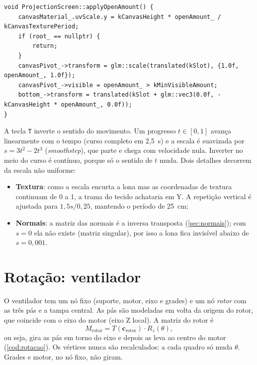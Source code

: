 \documentclass[
  12pt,          %
  oneside,       %
  a4paper,       %
  chapter=TITLE, %
  english,
  brazil,        %
]{abntex2}
\newcommand{\fonteautores}{\fonte{Elaborado pelos autores (2026).}}
\begin{document}
\begin{lstlisting}[caption={Escala da lona (\texttt{src/objects/projection\_screen.cpp}, sem comentários)},label={cod:escala}]
void ProjectionScreen::applyOpenAmount() {
    canvasMaterial_.uvScale.y = kCanvasHeight * openAmount_ / kCanvasTexturePeriod;
    if (root_ == nullptr) {
        return;
    }
    canvasPivot_->transform = glm::scale(translated(kSlot), {1.0f, openAmount_, 1.0f});
    canvasPivot_->visible = openAmount_ > kMinVisibleAmount;
    bottom_->transform = translated(kSlot + glm::vec3(0.0f, -kCanvasHeight * openAmount_, 0.0f));
}
\end{lstlisting}
\fonteautores

A tecla \texttt{T} inverte o sentido do movimento. Um progresso $t \in [0, 1]$ avança linearmente com o tempo
(curso completo em 2,5~s) e a escala é suavizada por $s = 3t^2 - 2t^3$ (\emph{smoothstep}), que parte e chega
com velocidade nula. Inverter no meio do curso é contínuo, porque só o sentido de $t$ muda. Dois detalhes
decorrem da escala não uniforme:
\begin{itemize}
  \item \textbf{Textura}: como a escala encurta a lona mas as coordenadas de textura continuam de 0 a 1, a trama
        do tecido achataria em Y. A repetição vertical é ajustada para $1{,}5 s / 0{,}25$, mantendo o período
        de 25~cm;
  \item \textbf{Normais}: a matriz das normais é a inversa transposta (\autoref{sec:normais}); com $s = 0$
        ela não existe (matriz singular), por isso a lona fica invisível abaixo de $s = 0{,}001$.
\end{itemize}

\section{Rotação: ventilador}

O ventilador tem um nó fixo (suporte, motor, eixo e grades) e um nó \emph{rotor} com as três pás e a tampa
central. As pás são modeladas em volta da origem do rotor, que coincide com o eixo do motor (eixo Z local).
A matriz do rotor é
\begin{equation}
  M_{\text{rotor}} = T(\mathbf{c}_{\text{rotor}}) \cdot R_z(\theta),
  \label{eq:rotacao}
\end{equation}
ou seja, gira as pás em torno do eixo e depois as leva ao centro do motor (\autoref{cod:rotacao}). Os vértices
nunca são recalculados: a cada quadro só muda $\theta$. Grades e motor, no nó fixo, não giram.
\end{document}
